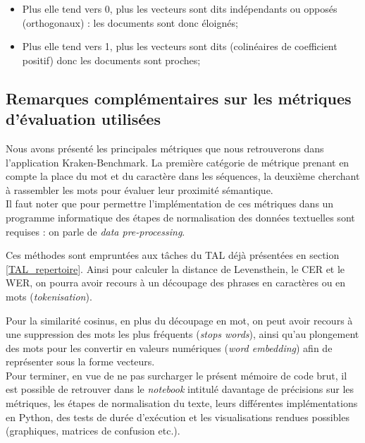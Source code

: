 \begin{itemize}
    \item Plus elle tend vers 0, plus les vecteurs sont dits indépendants ou opposés (orthogonaux) : les documents sont donc éloignés;
    \item Plus elle tend vers 1, plus les vecteurs sont dits (colinéaires de coefficient positif) donc les documents sont proches;
\end{itemize}

\subsection{Remarques complémentaires sur les métriques d'évaluation utilisées}

Nous avons présenté les principales métriques que nous retrouverons dans l'application Kraken-Benchmark. La première catégorie de métrique prenant en compte la place du mot et du caractère dans les séquences, la deuxième cherchant à rassembler les mots pour évaluer leur proximité sémantique.\\

Il faut noter que pour permettre l'implémentation de ces métriques dans un programme informatique des étapes de normalisation des données textuelles sont requises : on parle de \textit{data pre-processing}. 

Ces méthodes sont empruntées aux tâches du TAL déjà présentées en section \ref{TAL_repertoire}. Ainsi pour calculer la distance de Levensthein, le CER et le WER, on pourra avoir recours à un découpage des phrases en caractères ou en mots (\textit{tokenisation}). 

Pour la similarité cosinus, en plus du découpage en mot, on peut avoir recours à une suppression des mots les plus fréquents (\textit{stops words}), ainsi qu'au plongement des mots pour les convertir en valeurs numériques (\textit{word embedding}) afin de représenter sous la forme vecteurs.\\

Pour terminer, en vue de ne pas surcharger le présent mémoire de code brut, il est possible de retrouver dans le \textit{notebook} intitulé  davantage de précisions sur les métriques, les étapes de normalisation du texte, leurs différentes implémentations en Python, des tests de durée d'exécution et les visualisations rendues possibles (graphiques, matrices de confusion etc.).\\

